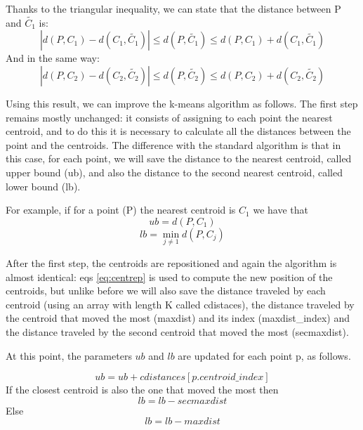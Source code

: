 \documentclass{report}
\begin{document}
\begin{minipage}[b]{0.48\textwidth}
  Thanks to the triangular inequality, we can state that the distance between P and $\tilde{C_1}$ is:
  \begin{equation*}
    |d(P, C_1) - d(C_1, \tilde{C_1})| \leq d(P, \tilde{C_1}) \leq d(P, C_1) + d(C_1, \tilde{C_1})
  \end{equation*}
  And in the same way:
  \begin{equation*}
    |d(P, C_2) - d(C_2, \tilde{C_2})| \leq d(P, \tilde{C_2}) \leq d(P, C_2) + d(C_2, \tilde{C_2})
  \end{equation*}

  Using this result, we can improve the k-means algorithm as follows.
  The first step remains mostly unchanged: it consists of assigning to each point the nearest centroid, and to do this it is necessary to calculate all the distances between the point and the centroids. The difference with the standard algorithm is that in this case, for each point, we will save the distance to the nearest centroid, called upper bound (ub), and also the distance to the second nearest centroid, called lower bound (lb).

  For example, if for a point (P) the nearest centroid is $C_1$ we have that
  \begin{equation}
      ub = d(P, C_1)
  \end{equation}
  \begin{equation}
      lb = \min\limits_{j \neq 1} d(P, C_j)
  \end{equation}

  After the first step, the centroids are repositioned and again the algorithm is almost identical: eqs \ref{eq:centrep} is used to compute the new position of the centroids, but unlike before we will also save the distance traveled by each centroid (using an array with length K called cdistaces), the distance traveled by the centroid that moved the most (maxdist) and its index (maxdist\_index) and the distance traveled by the second centroid that moved the most (secmaxdist).

  At this point, the parameters $ub$ and $lb$ are updated for each point p, as follows.

  \begin{equation}
    ub =  ub + cdistances[p.centroid\_index]
  \end{equation}
  If the closest centroid is also the one that moved the most then
  \begin{equation}
      lb = lb - secmaxdist
  \end{equation}
  Else
  \begin{equation}
      lb = lb - maxdist
  \end{equation}


\end{minipage}
\end{document}
